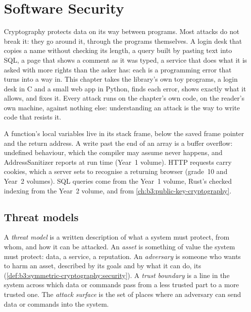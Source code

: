 \chapter{Software Security}\label{ch:b3:software-security}

Cryptography protects data on its way between programs. Most attacks do not break it: they go around it, through the programs themselves. A login desk that copies a name without checking its length, a query built by pasting text into SQL, a page that shows a comment as it was typed, a service that does what it is asked with more rights than the asker has: each is a programming error that turns into a way in. This chapter takes the library's own toy programs, a login desk in C and a small web app in Python, finds each error, shows exactly what it allows, and fixes it. Every attack runs on the chapter's own code, on the reader's own machine, against nothing else: understanding an attack is the way to write code that resists it.

\begin{recall}
A function's local variables live in its stack frame, below the saved frame pointer and the return address. A write past the end of an array is a buffer overflow: undefined behaviour, which the compiler may assume never happens, and AddressSanitizer reports at run time (Year~1 volume). HTTP requests carry cookies, which a server sets to recognise a returning browser (grade~10 and Year~2 volumes). SQL queries come from the Year~1 volume, Rust's checked indexing from the Year~2 volume, and  from \cref{ch:b3:public-key-cryptography}.
\end{recall}

\section{Threat models}\label{sec:b3:software-security:threat}

\begin{definition}\label{def:b3:software-security:threat}
A \emph{threat model} is a written description of what a system must protect, from whom, and how it can be attacked. An \emph{asset} is something of value the system must protect: data, a service, a reputation. An \emph{adversary} is someone who wants to harm an asset, described by its goals and by what it can do, its  (\cref{def:b3:symmetric-cryptography:security}). A \emph{trust boundary} is a line in the system across which data or commands pass from a less trusted part to a more trusted one. The \emph{attack surface} is the set of places where an adversary can send data or commands into the system.
\end{definition}

